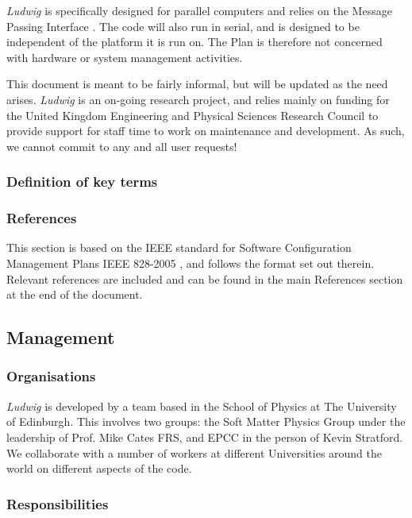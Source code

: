 \textit{Ludwig} is specifically designed for parallel computers and
relies on the Message Passing Interface \cite{mpi-standard}. The
code will also run in serial, and is designed to be independent of
the platform it is run on. The Plan is therefore not concerned with
hardware or system management activities.

This document is meant to be fairly informal, but will be updated as
the need arises. 
\textit{Ludwig} is an on-going research project, and relies mainly
on funding for the United Kingdom Engineering and Physical Sciences Research
Council to provide support for staff time to work on maintenance and
development. As such, we cannot commit to any and all user requests!

\subsubsection{Definition of key terms}

\subsubsection{References}

This section is based on the IEEE standard for Software Configuration
Management Plans IEEE 828-2005 \cite{ieee-208}, and follows the format
set out therein.
Relevant references are included and can be found in the main References
section at the end of the document.

\subsection{Management}

\subsubsection{Organisations}

\textit{Ludwig} is developed by a team based in the School of Physics at
The University of Edinburgh. This involves two groups: the Soft Matter
Physics Group under the leadership of Prof. Mike Cates FRS, and EPCC in
the person of Kevin Stratford. We collaborate with a number of workers at
different Universities around the world on different aspects of the code.

\subsubsection{Responsibilities}

